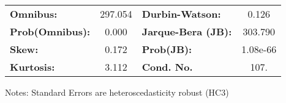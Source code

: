 \begin{center}
\begin{tabular}{lcccccc}
\bottomrule
\end{tabular}
\begin{tabular}{lclc}
\textbf{Omnibus:}       & 297.054 & \textbf{  Durbin-Watson:     } &    0.126  \\
\textbf{Prob(Omnibus):} &   0.000 & \textbf{  Jarque-Bera (JB):  } &  303.790  \\
\textbf{Skew:}          &   0.172 & \textbf{  Prob(JB):          } & 1.08e-66  \\
\textbf{Kurtosis:}      &   3.112 & \textbf{  Cond. No.          } &     107.  \\
\bottomrule
\end{tabular}
\end{center}

Notes: \newline
 [1] Standard Errors are heteroscedasticity robust (HC3)